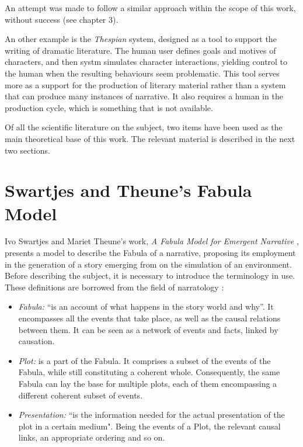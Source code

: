 \documentclass[12pt,a4paper,oneside]{report}
\begin{document}
An attempt was made to follow a similar approach within the scope of this work, without success (see chapter 3).

\bigskip

An other example is the \textit{Thespian} \cite{thespian} system, designed as a tool to support the writing of dramatic literature. The human user defines goals and motives of characters, and then systm simulates character interactions, yielding control to the human when the resulting behaviours seem problematic. This tool serves more as a support for the production of literary material rather than a system that can produce many instances of narrative. It also requires a human in the production cycle, which is something that is not available.

\bigskip

Of all the scientific literature on the subject, two items have been used as the main theoretical base of this work. The relevant material is described in the next two sections.

\pagebreak

\section{Swartjes and Theune's Fabula Model}
Ivo Swartjes and Mariet Theune's work, \textit{A Fabula Model for Emergent Narrative} \cite{swartje}, presents a model to describe the Fabula of a narrative, proposing its employment in the generation of a story emerging from on the simulation of an environment. Before describing the subject, it is necessary to introduce the  terminology in use. These definitions are borrowed from the field of narratology \cite{bal85}:

\begin{itemize}\setlength{\itemsep}{0pt}
\item \textit{Fabula:} ``is an account of what happens in the story world and why''. It encompasses all the events that take place, as well as the causal relations between them.  It can be seen as a network of events and facts, linked by causation.
\item \textit{Plot:} is a part of the Fabula. It comprises a subset of the events of the Fabula, while still constituting a coherent whole. Consequently, the same Fabula can lay the base for multiple plots, each of them encompassing a different coherent subset of events.
\item \textit{Presentation:} ``is the information needed for the actual presentation of the plot in a certain medium". Being the events of a Plot, the relevant causal links, an appropriate ordering and so on.
\end{itemize}
\end{document}
